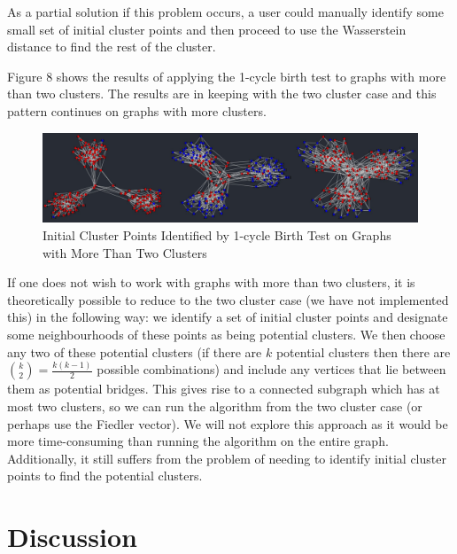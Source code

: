 \documentclass[12pt,a4paper]{amsart}
\numberwithin{equation}{section}
\theoremstyle{plain}
\theoremstyle{definition}
\begin{document}
As a partial solution if this problem occurs, a user could manually identify some small set of initial cluster points and then proceed to use the Wasserstein distance to find the rest of the cluster.

Figure 8 shows the results of applying the 1-cycle birth test to graphs with more than two clusters. The results are in keeping with the two cluster case and this pattern continues on graphs with more clusters.

\begin{figure}[h]
	\centering	
	\caption{Initial Cluster Points Identified by 1-cycle Birth Test on Graphs with More Than Two Clusters}
	\includegraphics[scale=0.5]{Multiclusters.jpg}
\end{figure}

If one does not wish to work with graphs with more than two clusters, it is theoretically possible to reduce to the two cluster case (we have not implemented this) in the following way: we identify a set of initial cluster points and designate some neighbourhoods of these points as being potential clusters. We then choose any two of these potential clusters (if there are $k$ potential clusters then there are $\binom{k}{2} = \frac{k(k-1)}{2}$ possible combinations) and include any vertices that lie between them as potential bridges. This gives rise to a connected subgraph which has at most two clusters, so we can run the algorithm from the two cluster case (or perhaps use the Fiedler vector). We will not explore this approach as it would be more time-consuming than running the algorithm on the entire graph. Additionally, it still suffers from the problem of needing to identify initial cluster points to find the potential clusters.



\section{Discussion}







\newpage
\end{document}
